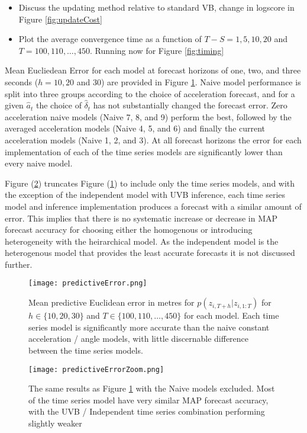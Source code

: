 \documentclass[12pt,a4paper]{article}\usepackage[]{graphicx}\usepackage[]{color}
\begin{document}
\begin{itemize}
\item Discuss the updating method relative to standard VB, change in logscore in Figure \ref{fig:updateCost}
\item Plot the average convergence time as a function of $T - S = 1, 5, 10, 20$ and $T = 100, 110, \dots,  450$. Running now for Figure \ref{fig:timing}
\end{itemize}

Mean Eucliedean Error for each model at forecast horizons of one, two, and three seconds ($h = 10, 20$ and $30$) are provided in Figure \ref{fig:PredError}. Naive model performance is split into three groups according to the choice of acceleration forecast, and for a given $\hat{a}_t$ the choice of $\hat{\delta}_t$ has not substantially changed the forecast error. Zero acceleration naive models (Naive 7, 8, and 9) perform the best, followed by the averaged acceleration models (Naive 4, 5, and 6) and finally the current acceleration models (Naive 1, 2, and 3). At all forecast horizons the error for each implementation of each of the time series models are significantly lower than every naive model.

Figure (\ref{fig:PredErrorZ}) truncates Figure (\ref{fig:PredError}) to include only the time series models, and with the exception of the independent model with UVB inference, each time series model and inference implementation produces a forecast with a similar amount of error. This implies that there is no systematic increase or decrease in MAP forecast accuracy for choosing either the homogenous or introducing heterogeneity with the heirarchical model. As the independent model is the heterogenous model that provides the least accurate forecasts it is not discussed further.

\begin{figure}[ht]
\centering
\texttt{[image: predictiveError.png]}
\caption{Mean predictive Euclidean error in metres for $p(z_{i, T+h} | z_{i, 1:T})$ for $h \in \{10, 20, 30\}$ and $T \in \{100, 110, \dots, 450\}$ for each model. Each time series model is significantly more accurate than the naive constant acceleration / angle models, with little discernable difference between the time series models.}
\label{fig:PredError}
\end{figure}

\begin{figure}[h]
\centering
\texttt{[image: predictiveErrorZoom.png]}
\caption{The same results as Figure \ref{fig:PredError} with the Naive models excluded. Most of the time series model have very similar MAP forecast accuracy, with the UVB / Independent time series combination performing slightly weaker}
\label{fig:PredErrorZ}
\end{figure}
\end{document}
